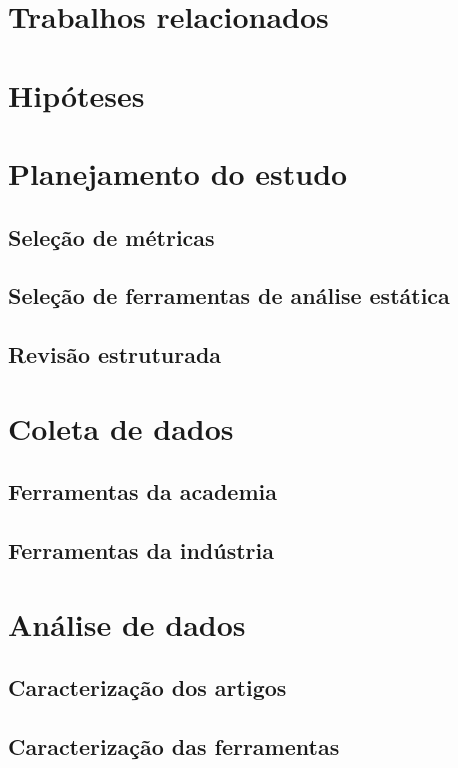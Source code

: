 \documentclass[qual, classic, a4paper]{ufbathesis}
\begin{document}
\section{Trabalhos relacionados}

\section{Hipóteses}

\section{Planejamento do estudo}

\subsection{Seleção de métricas}

\subsection{Seleção de ferramentas de análise estática}

\subsection{Revisão estruturada}

\section{Coleta de dados}

\subsection{Ferramentas da academia}

\subsection{Ferramentas da indústria}

\section{Análise de dados}

\subsection{Caracterização dos artigos}

\subsection{Caracterização das ferramentas}
\end{document}
